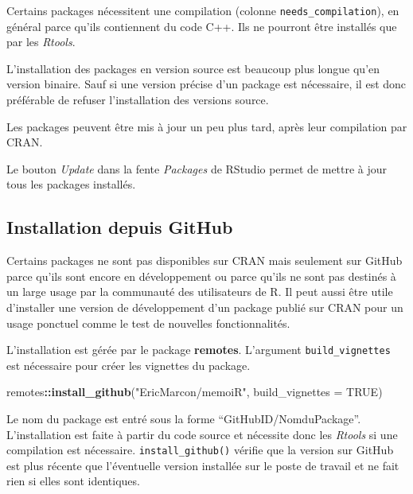 \documentclass[
  12pt,
  french,
  a4paper,
  extrafontsizes,onecolumn,openright
  ]{memoir}
\newenvironment{Shaded}{\begin{snugshade}}{\end{snugshade}}
\newcommand{\DataTypeTok}[1]{\textcolor[rgb]{0.13,0.29,0.53}{#1}}
\newcommand{\KeywordTok}[1]{\textcolor[rgb]{0.13,0.29,0.53}{\textbf{#1}}}
\newcommand{\NormalTok}[1]{#1}
\newcommand{\OperatorTok}[1]{\textcolor[rgb]{0.81,0.36,0.00}{\textbf{#1}}}
\newcommand{\OtherTok}[1]{\textcolor[rgb]{0.56,0.35,0.01}{#1}}
\newcommand{\StringTok}[1]{\textcolor[rgb]{0.31,0.60,0.02}{#1}}
\begin{document}
Certains packages nécessitent une compilation (colonne \texttt{needs\_compilation}), en général parce qu'ils contiennent du code C++.
Ils ne pourront être installés que par les \emph{Rtools}.

L'installation des packages en version source est beaucoup plus longue qu'en version binaire.
Sauf si une version précise d'un package est nécessaire, il est donc préférable de refuser l'installation des versions source.

Les packages peuvent être mis à jour un peu plus tard, après leur compilation par CRAN.

Le bouton \emph{Update} dans la fente \emph{Packages} de RStudio permet de mettre à jour tous les packages installés.

\hypertarget{installation-depuis-github}{%
\subsection{Installation depuis GitHub}\label{installation-depuis-github}}

Certains packages ne sont pas disponibles sur CRAN mais seulement sur GitHub parce qu'ils sont encore en développement ou parce qu'ils ne sont pas destinés à un large usage par la communauté des utilisateurs de R.
Il peut aussi être utile d'installer une version de développement d'un package publié sur CRAN pour un usage ponctuel comme le test de nouvelles fonctionnalités.

L'installation est gérée par le package \textbf{remotes}.
L'argument \texttt{build\_vignettes} est nécessaire pour créer les vignettes du package.

\scriptsize

\begin{Shaded}
\begin{Highlighting}[]
\NormalTok{remotes}\OperatorTok{::}\KeywordTok{install_github}\NormalTok{(}\StringTok{"EricMarcon/memoiR"}\NormalTok{, }\DataTypeTok{build_vignettes =} \OtherTok{TRUE}\NormalTok{)}
\end{Highlighting}
\end{Shaded}

\normalsize

Le nom du package est entré sous la forme \enquote{GitHubID/NomduPackage}.
L'installation est faite à partir du code source et nécessite donc les \emph{Rtools} si une compilation est nécessaire.
\texttt{install\_github()} vérifie que la version sur GitHub est plus récente que l'éventuelle version installée sur le poste de travail et ne fait rien si elles sont identiques.
\end{document}
